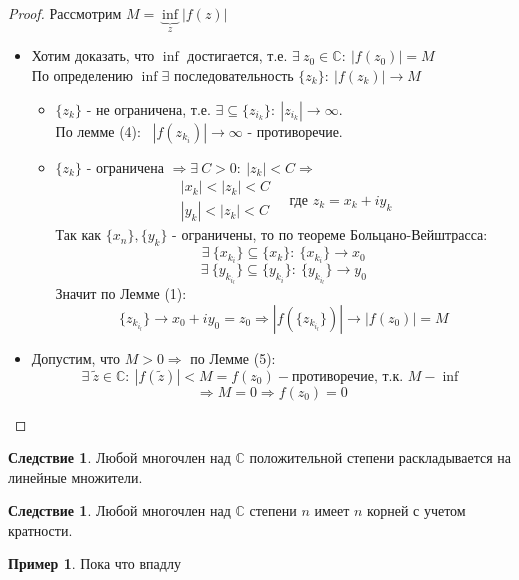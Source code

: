 \documentclass[a4paper, 12pt]{article}
\newcounter{concount}
\theoremstyle{definition}
\newtheorem{consequensenum}[concount]{Следствие}
\newtheorem*{example1}{Пример}
\begin{document}
  \begin{proof}
    Рассмотрим $M = \underbrace{\inf}_{z} |f(z)|$
    \begin{itemize}
      \item[\textit{1 шаг.}] Хотим доказать, что $\inf$ достигается, т.е. $\exists \ z_0 \in \mathbb{C}: \ |f(z_0)| = M$\\
      По определению $\inf \exists$ последовательность $\{z_k\}: \ |f(z_k)| \to M$
      \begin{itemize}
        \item[1 случай.] $\{z_k\}$  - не ограничена, т.е. $\exists \subseteq \{z_{i_k}\}: \ |z_{i_k}| \to \infty$. \\
        По лемме (4): \ $|f(z_{k_i})| \to \infty$ - противоречие. 
        \item[2 случай.] $\{z_k\}$ - ограничена $\Longrightarrow \exists \ C > 0: \ |z_k | < C \Longrightarrow$   
        $$\begin{matrix}
          |x_k|<|z_k|<C \\
          |y_k|<|z_k|<C
        \end{matrix} \ \ \ \text{ где } z_k = x_k + iy_k$$
        Так как $\{x_n\}, \{y_k\}$ - ограничены, то по теореме Больцано-Вейштрасса:
        $$\exists \ \{x_{k_{i}}\}\subseteq \{x_{k}\}: \ \{x_{k_{i}}\} \to x_0$$
        $$\exists \ \{y_{k_{i_l}}\}\subseteq \{y_{k_{i}}\}: \ \{y_{k_{i_l}}\} \to y_0$$
        Значит по Лемме (1):
        $$\{z_{k_{i_l}}\} \to x_0 + iy_0 = z_0 \Longrightarrow |f(\{z_{k_{i_l}}\})| \to |f(z_0)| = M$$  
      \end{itemize}
      \item[\textit{2 шаг.}] Допустим, что $M>0 \Longrightarrow$ по Лемме (5):
      $$\exists \ \widetilde{z} \in \mathbb{C}: \ |f(\widetilde{z})|<M = f(z_0) - \text{противоречие, т.к. } M - \inf $$
      $$\Longrightarrow M=0 \Longrightarrow f(z_0) =0$$  
    \end{itemize}
  \end{proof} 
  \begin{consequensenum}
    Любой многочлен над $\mathbb{C}$ положительной степени раскладывается на линейные множители. 
  \end{consequensenum}
  \begin{consequensenum}
    Любой многочлен над $\mathbb{C}$ степени $n$ имеет $n$ корней с учетом кратности. 
  \end{consequensenum} 
  \begin{example1}
    Пока что впадлу
  \end{example1}
\end{document}
